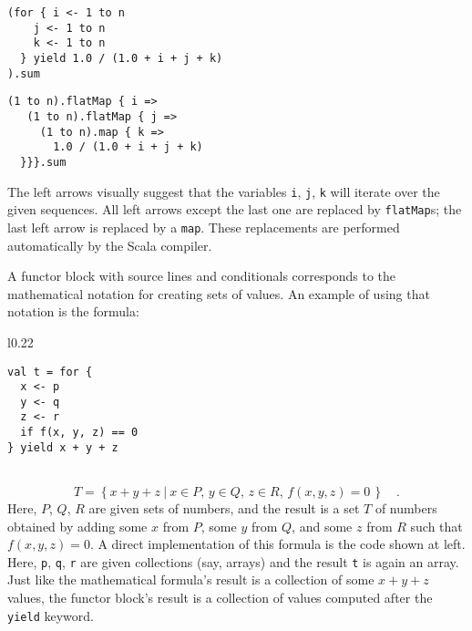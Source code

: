 \noindent \texttt{\textcolor{blue}{\footnotesize{}}}%
\begin{minipage}[c]{0.475\columnwidth}%
\texttt{\textcolor{blue}{\footnotesize{}}}
\begin{lstlisting}
(for { i <- 1 to n
    j <- 1 to n
    k <- 1 to n
  } yield 1.0 / (1.0 + i + j + k)
).sum
\end{lstlisting}
%
\end{minipage}\texttt{\textcolor{blue}{\footnotesize{}\hspace*{\fill}}}%
\begin{minipage}[c]{0.475\columnwidth}%
\texttt{\textcolor{blue}{\footnotesize{}}}
\begin{lstlisting}
(1 to n).flatMap { i =>
   (1 to n).flatMap { j =>
     (1 to n).map { k =>
       1.0 / (1.0 + i + j + k)
  }}}.sum
\end{lstlisting}
%
\end{minipage}{\footnotesize\par}

\vspace{0.2\baselineskip}
The left arrows visually suggest that the variables \lstinline!i!,
\lstinline!j!, \lstinline!k! will iterate over the given sequences.
All left arrows except the last one are replaced by \lstinline!flatMap!s;
the last left arrow is replaced by a \lstinline!map!. These replacements
are performed automatically by the Scala compiler.

A functor block with source lines and conditionals corresponds to
the mathematical notation for creating sets of values. An example
of using that notation is the formula:

\begin{wrapfigure}{l}{0.22\columnwidth}%
\vspace{-0.6\baselineskip}
\begin{lstlisting}
val t = for {
  x <- p
  y <- q
  z <- r
  if f(x, y, z) == 0
} yield x + y + z
\end{lstlisting}
\vspace{0.6\baselineskip}
\end{wrapfigure}%

~\vspace{-0.3\baselineskip}
\[
T=\left\{ \left.x+y+z~\right|~x\in P,\,y\in Q,\,z\in R,\,f(x,y,z)=0\,\right\} \quad.
\]
Here, $P$, $Q$, $R$ are given sets of numbers, and the result is
a set $T$ of numbers obtained by adding some $x$ from $P$, some
$y$ from $Q$, and some $z$ from $R$ such that $f(x,y,z)=0$. A
direct implementation of this formula is the code shown at left. Here,
\lstinline!p!, \lstinline!q!, \lstinline!r! are given collections
(say, arrays) and the result \lstinline!t! is again an array. Just
like the mathematical formula\textsf{'}s result is a collection of some $x+y+z$
values, the functor block\textsf{'}s result is a collection of values computed
after the \lstinline!yield! keyword.

